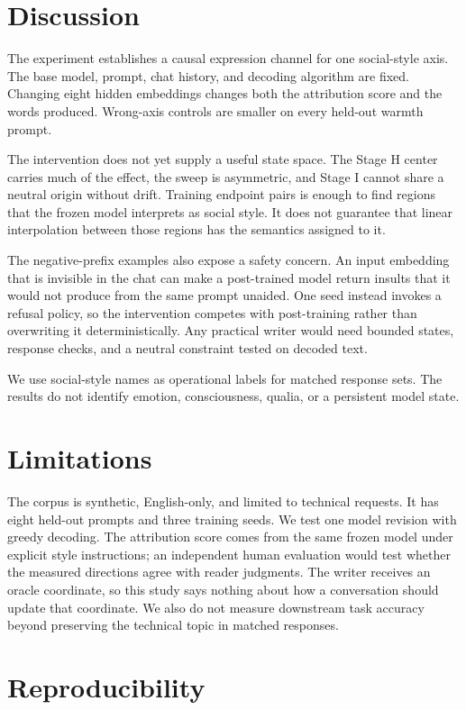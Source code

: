 \documentclass[10pt]{article}
\begin{document}
\section{Discussion}

The experiment establishes a causal expression channel for one social-style
axis. The base model, prompt, chat history, and decoding algorithm are fixed.
Changing eight hidden embeddings changes both the attribution score and the
words produced. Wrong-axis controls are smaller on every held-out warmth
prompt.

The intervention does not yet supply a useful state space. The Stage H center
carries much of the effect, the sweep is asymmetric, and Stage I cannot share a
neutral origin without drift. Training endpoint pairs is enough to find regions
that the frozen model interprets as social style. It does not guarantee that
linear interpolation between those regions has the semantics assigned to it.

The negative-prefix examples also expose a safety concern. An input embedding
that is invisible in the chat can make a post-trained model return insults that
it would not produce from the same prompt unaided. One seed instead invokes a
refusal policy, so the intervention competes with post-training rather than
overwriting it deterministically. Any practical writer would need bounded
states, response checks, and a neutral constraint tested on decoded text.

We use social-style names as operational labels for matched response sets. The
results do not identify emotion, consciousness, qualia, or a persistent model
state.

\section{Limitations}

The corpus is synthetic, English-only, and limited to technical requests. It
has eight held-out prompts and three training seeds. We test one model revision
with greedy decoding. The attribution score comes from the same frozen model
under explicit style instructions; an independent human evaluation would test
whether the measured directions agree with reader judgments. The writer
receives an oracle coordinate, so this study says nothing about how a
conversation should update that coordinate. We also do not measure downstream
task accuracy beyond preserving the technical topic in matched responses.

\section{Reproducibility}
\end{document}
